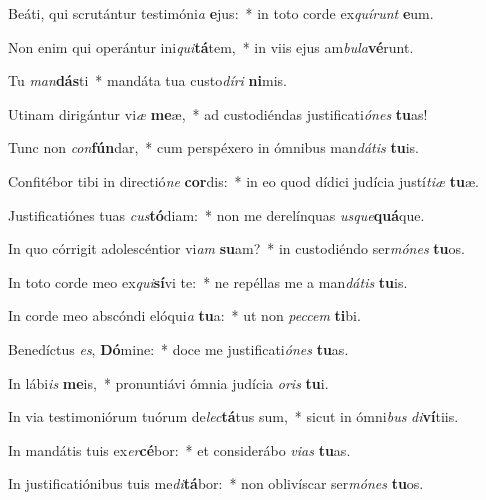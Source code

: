 \item Beáti, qui scrutántur testimóni\textit{a} \textbf{e}jus:~* in toto corde ex\textit{quí}\textit{runt} \textbf{e}um.
\item Non enim qui operántur ini\textit{qui}\textbf{tá}tem,~* in viis ejus am\textit{bu}\textit{la}\textbf{vé}runt.
\item Tu \textit{man}\textbf{dás}ti~* mandáta tua custo\textit{dí}\textit{ri} \textbf{ni}mis.
\item Utinam dirigántur vi\textit{æ} \textbf{me}æ,~* ad custodiéndas justificati\textit{ó}\textit{nes} \textbf{tu}as!
\item Tunc non \textit{con}\textbf{fún}dar,~* cum perspéxero in ómnibus man\textit{dá}\textit{tis} \textbf{tu}is.
\item Confitébor tibi in directió\textit{ne} \textbf{cor}dis:~* in eo quod dídici judícia justí\textit{ti}\textit{æ} \textbf{tu}æ.
\item Justificatiónes tuas \textit{cus}\textbf{tó}diam:~* non me derelínquas \textit{us}\textit{que}\textbf{quá}que.
\item In quo córrigit adolescéntior vi\textit{am} \textbf{su}am?~* in custodiéndo ser\textit{mó}\textit{nes} \textbf{tu}os.
\item In toto corde meo ex\textit{qui}\textbf{sí}vi te:~* ne repéllas me a man\textit{dá}\textit{tis} \textbf{tu}is.
\item In corde meo abscóndi elóqui\textit{a} \textbf{tu}a:~* ut non \textit{pec}\textit{cem} \textbf{ti}bi.
\item Benedíctus \textit{es}, \textbf{Dó}mine:~* doce me justificati\textit{ó}\textit{nes} \textbf{tu}as.
\item In lábi\textit{is} \textbf{me}is,~* pronuntiávi ómnia judícia \textit{o}\textit{ris} \textbf{tu}i.
\item In via testimoniórum tuórum de\textit{lec}\textbf{tá}tus sum,~* sicut in ómni\textit{bus} \textit{di}\textbf{ví}tiis.
\item In mandátis tuis ex\textit{er}\textbf{cé}bor:~* et considerábo \textit{vi}\textit{as} \textbf{tu}as.
\item In justificatiónibus tuis me\textit{di}\textbf{tá}bor:~* non oblivíscar ser\textit{mó}\textit{nes} \textbf{tu}os.
